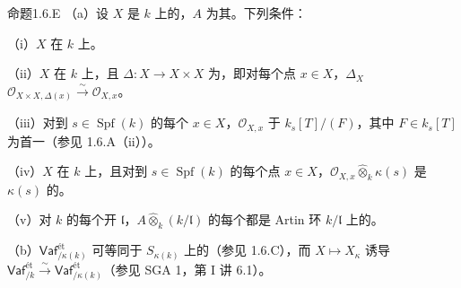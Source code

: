 \begin{SGAresult}{命题}{1.6.E}
（a）设 $X$ 是 $k$ 上的，$A$ 为其。下列条件：

（i）$X$ 在 $k$ 上。

（ii）$X$ 在 $k$ 上，且 $\Delta:X\to X\times X$ 为，即对每个点 $x\in X$，$\Delta_X$  $\mathcal O_{X\times X,\Delta(x)}\xrightarrow{\sim}\mathcal O_{X,x}$。

（iii）对到 $s\in\operatorname{Spf}(k)$ 的每个 $x\in X$，$\mathcal O_{X,x}$ 于 $k_s[T]/(F)$，其中 $F\in k_s[T]$ 为首一（参见 1.6.A（ii））。

（iv）$X$ 在 $k$ 上，且对到 $s\in\operatorname{Spf}(k)$ 的每个点 $x\in X$，$\mathcal O_{X,x}\widehat\otimes_k\kappa(s)$ 是 $\kappa(s)$ 的。

（v）对 $k$ 的每个开 $\mathfrak l$，$A\widehat\otimes_k(k/\mathfrak l)$ 的每个都是 Artin 环 $k/\mathfrak l$ 上的。

（b）$\mathsf{Vaf}^{\text{ét}}_{/\kappa(k)}$ 可等同于 $S_{\kappa(k)}$ 上的（参见 1.6.C），而 $X\mapsto X_\kappa$ 诱导 $\mathsf{Vaf}^{\text{ét}}_{/k}\xrightarrow{\sim}\mathsf{Vaf}^{\text{ét}}_{/\kappa(k)}$（参见 SGA 1，第 I 讲 6.1）。
\end{SGAresult}
